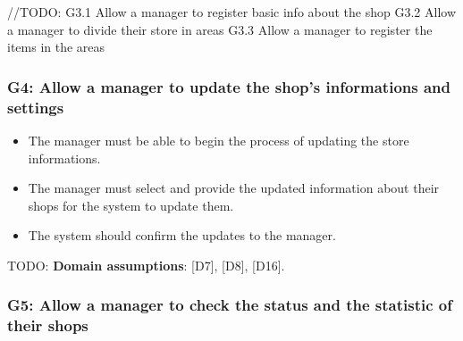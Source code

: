 //TODO:
G3.1   Allow a manager to register basic info about the shop \newline
G3.2   Allow a manager to divide their store in areas \newline
G3.3   Allow a manager to register the items in the areas

\subsubsection{G4: Allow a manager to update the shop's informations and settings}
\label{subsubsect:G4}

\begin{itemize}[topsep=0pt]
    \item The manager must be able to begin the process of updating the store informations.
    \item The manager must select and provide the updated information about their shops for the system to update them. 
    \item The system should confirm the updates to the manager. 
\end{itemize}

TODO: \textbf{Domain assumptions}: [D7], [D8], [D16].

\subsubsection{G5: Allow a manager to check the status and the statistic of their shops}
\label{subsubsect:G5}

